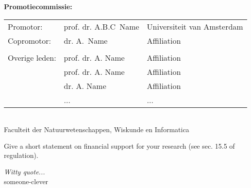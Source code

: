 \clearpage



{\bf\normalsize Promotiecommissie:} \\[0.2cm]

\begin{tabular}{@{}lll}
	Promotor:		& prof. dr. A.B.C~Name			 	& Universiteit van Amsterdam	\\
	Copromotor: 	& dr. A.~Name						& Affiliation					\\
					&									&								\\
	Overige leden:	& prof. dr. A. Name		          	& Affiliation					\\
                    & prof. dr. A. Name		          	& Affiliation					\\
                    & dr. A. Name			          	& Affiliation					\\
                    & ...					          	& ...							\\
\end{tabular} \\[0.2cm]

Faculteit der Natuurwetenschappen, Wiskunde en Informatica

\vspace*{\fill}
{\small
	Give a short statement on financial support for your
	research (see sec. 15.5 of regulation). 
} \vspace{0.5em}


\clearpage



\null\vfill\null
\parbox{100mm}{
	\raggedleft
	\emph{\large Witty quote...} \\
	someone-clever
}
\null\vfill\null


\cleardoublepage
\pagestyle{fancy}
\setlength\parindent{15pt}

